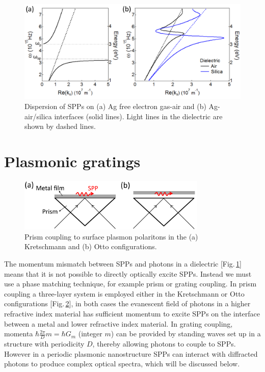 \begin{figure}[h!] 
\centering    
\includegraphics[width=\textwidth]{Fig2}
\caption{Dispersion of SPPs on (a) Ag free electron gas-air \cite{Zeman1987} and (b) Ag-air/silica interfaces \cite{Johnson1972} (solid lines). Light lines in the dielectric are shown by dashed lines.}
\label{3Fig2}
\end{figure}


\section{Plasmonic gratings}
\label{sec:plasmonicgratings}
\begin{figure}[h!]
\centering
\includegraphics[width=0.8\textwidth]{PrismCoupling}
\caption{Prism coupling to surface plasmon polaritons in the (a) Kretschmann and (b) Otto configurations.}
\label{PrismCoupling}
\end{figure}
The momentum mismatch between SPPs and photons in a dielectric [Fig.\,\ref{3Fig2}] means that it is not possible to directly optically excite SPPs. Instead we must use a phase matching technique, for example prism or grating coupling. In prism coupling a three-layer system is employed either in the Kretschmann or Otto configurations [Fig.\,\ref{PrismCoupling}], in both cases the evanescent field of photons in a higher refractive index material has sufficient momentum to excite SPPs on the interface between a metal and lower refractive index material. In grating coupling, momenta $\hbar\frac{2\pi}{D}m = \hbar G_m$ (integer $m$) can be provided by standing waves set up in a structure with periodicity $D$, thereby allowing photons to couple to SPPs. However in a periodic plasmonic nanostructure SPPs can interact with diffracted photons to produce complex optical spectra, which will be discussed below.

